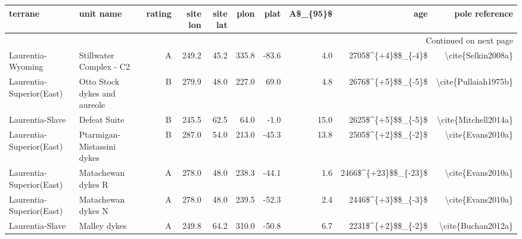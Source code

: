 \begin{longtable}{p{1 in}p{1 in}rrrrrrrr}
\toprule
                       terrane &                                        unit name & rating &  site lon &  site lat &  plon &  plat &  A\$\_\{95\}\$ &                    age &                                     pole reference \\
\midrule
\endhead
\midrule
\multicolumn{10}{r}{{Continued on next page}} \\
\midrule
\endfoot

\bottomrule
\endlastfoot
             Laurentia-Wyoming &                          Stillwater Complex - C2 &      A &     249.2 &      45.2 & 335.8 & -83.6 &       4.0 &     2705\$\textasciicircum \{+4\}\$\$\_\{-4\}\$ &                                 \textbackslash cite\{Selkin2008a\} \\
      Laurentia-Superior(East) &                     Otto Stock dykes and aureole &      B &     279.9 &      48.0 & 227.0 &  69.0 &       4.8 &     2676\$\textasciicircum \{+5\}\$\$\_\{-5\}\$ &                               \textbackslash cite\{Pullaiah1975b\} \\
               Laurentia-Slave &                                     Defeat Suite &      B &     245.5 &      62.5 &  64.0 &  -1.0 &      15.0 &     2625\$\textasciicircum \{+5\}\$\$\_\{-5\}\$ &                               \textbackslash cite\{Mitchell2014a\} \\
      Laurentia-Superior(East) &                       Ptarmigan-Mistassini dykes &      B &     287.0 &      54.0 & 213.0 & -45.3 &      13.8 &     2505\$\textasciicircum \{+2\}\$\$\_\{-2\}\$ &                                  \textbackslash cite\{Evans2010a\} \\
      Laurentia-Superior(East) &                               Matachewan dykes R &      A &     278.0 &      48.0 & 238.3 & -44.1 &       1.6 &   2466\$\textasciicircum \{+23\}\$\$\_\{-23\}\$ &                                  \textbackslash cite\{Evans2010a\} \\
      Laurentia-Superior(East) &                               Matachewan dykes N &      A &     278.0 &      48.0 & 239.5 & -52.3 &       2.4 &     2446\$\textasciicircum \{+3\}\$\$\_\{-3\}\$ &                                  \textbackslash cite\{Evans2010a\} \\
               Laurentia-Slave &                                     Malley dykes &      A &     249.8 &      64.2 & 310.0 & -50.8 &       6.7 &     2231\$\textasciicircum \{+2\}\$\$\_\{-2\}\$ &                                 \textbackslash cite\{Buchan2012a\} \\

\end{longtable}

